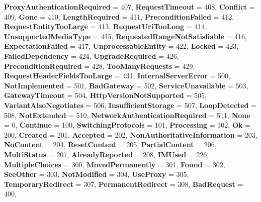 \begin{DoxyCompactItemize}
{\bfseries Proxy\+Authentication\+Required} = 407, 
\newline
{\bfseries Request\+Timeout} = 408, 
{\bfseries Conflict} = 409, 
{\bfseries Gone} = 410, 
{\bfseries Length\+Required} = 411, 
\newline
{\bfseries Precondition\+Failed} = 412, 
{\bfseries Request\+Entity\+Too\+Large} = 413, 
{\bfseries Request\+Uri\+Too\+Long} = 414, 
{\bfseries Unsupported\+Media\+Type} = 415, 
\newline
{\bfseries Requested\+Range\+Not\+Satisfiable} = 416, 
{\bfseries Expectation\+Failed} = 417, 
{\bfseries Unprocessable\+Entity} = 422, 
{\bfseries Locked} = 423, 
\newline
{\bfseries Failed\+Dependency} = 424, 
{\bfseries Upgrade\+Required} = 426, 
{\bfseries Precondition\+Required} = 428, 
{\bfseries Too\+Many\+Requests} = 429, 
\newline
{\bfseries Request\+Header\+Fields\+Too\+Large} = 431, 
{\bfseries Internal\+Server\+Error} = 500, 
{\bfseries Not\+Implemented} = 501, 
{\bfseries Bad\+Gateway} = 502, 
\newline
{\bfseries Service\+Unavailable} = 503, 
{\bfseries Gateway\+Timeout} = 504, 
{\bfseries Http\+Version\+Not\+Supported} = 505, 
{\bfseries Variant\+Also\+Negotiates} = 506, 
\newline
{\bfseries Insufficient\+Storage} = 507, 
{\bfseries Loop\+Detected} = 508, 
{\bfseries Not\+Extended} = 510, 
{\bfseries Network\+Authentication\+Required} = 511, 
\newline
{\bfseries None} = 0, 
{\bfseries Continue} = 100, 
{\bfseries Switching\+Protocols} = 101, 
{\bfseries Processing} = 102, 
\newline
{\bfseries Ok} = 200, 
{\bfseries Created} = 201, 
{\bfseries Accepted} = 202, 
{\bfseries Non\+Authoritative\+Information} = 203, 
\newline
{\bfseries No\+Content} = 204, 
{\bfseries Reset\+Content} = 205, 
{\bfseries Partial\+Content} = 206, 
{\bfseries Multi\+Status} = 207, 
\newline
{\bfseries Already\+Reported} = 208, 
{\bfseries I\+M\+Used} = 226, 
{\bfseries Multiple\+Choices} = 300, 
{\bfseries Moved\+Permanently} = 301, 
\newline
{\bfseries Found} = 302, 
{\bfseries See\+Other} = 303, 
{\bfseries Not\+Modified} = 304, 
{\bfseries Use\+Proxy} = 305, 
\newline
{\bfseries Temporary\+Redirect} = 307, 
{\bfseries Permanent\+Redirect} = 308, 
{\bfseries Bad\+Request} = 400, 

\end{DoxyCompactItemize}
